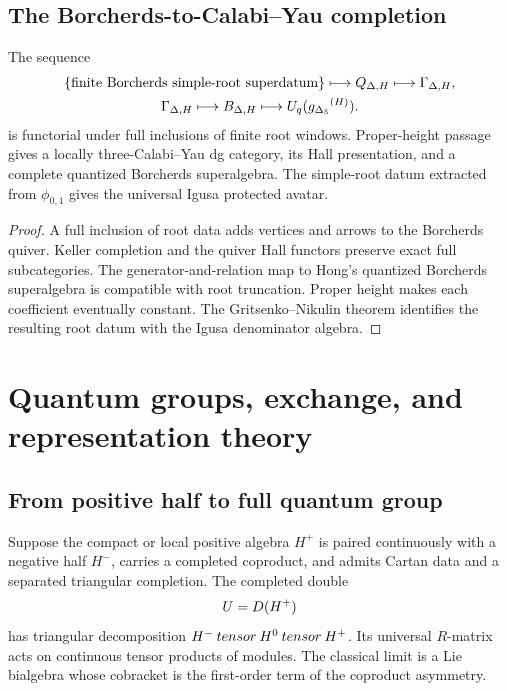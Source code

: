 \chapter{The Borcherds-to-Calabi--Yau completion}
\begin{theorem}
The sequence
\[
\begin{gathered}
 \left\{\text{finite Borcherds simple-root superdatum}\right\}
 \longmapsto Q_{\Delta,H}
 \longmapsto \Gamma_{\Delta,H},\\
 \Gamma_{\Delta,H}
 \longmapsto B_{\Delta,H}
 \longmapsto U_q({g_{\Delta_5}}^{(H)}).
\end{gathered}
\]
is functorial under full inclusions of finite root windows.  Proper-height passage gives a locally three-Calabi--Yau dg category, its Hall presentation, and a complete quantized Borcherds superalgebra.  The simple-root datum extracted from $\phi_{0,1}$ gives the universal Igusa protected avatar.
\end{theorem}
\begin{proof}
A full inclusion of root data adds vertices and arrows to the Borcherds quiver.  Keller completion and the quiver Hall functors preserve exact full subcategories.  The generator-and-relation map to Hong's quantized Borcherds superalgebra is compatible with root truncation.  Proper height makes each coefficient eventually constant.  The Gritsenko--Nikulin theorem identifies the resulting root datum with the Igusa denominator algebra.
\end{proof}


\part{Quantum groups, exchange, and representation theory}

\chapter{From positive half to full quantum group}
Suppose the compact or local positive algebra $H^+$ is paired continuously with a negative half $H^-$, carries a completed coproduct, and admits Cartan data and a separated triangular completion. The completed double
\[
 U=D(H^+)
\]
has triangular decomposition $H^-\mathbin{tensor} H^0\mathbin{tensor} H^+$. Its universal $R$-matrix acts on continuous tensor products of modules. The classical limit is a Lie bialgebra whose cobracket is the first-order term of the coproduct asymmetry.

